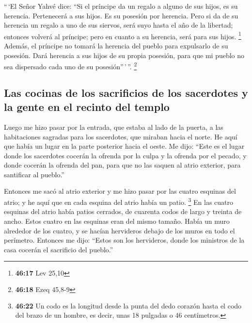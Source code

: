 \begin{paracol}{2}
 ``\,`El Señor Yahvé dice: ``Si el príncipe da un regalo
a alguno de sus hijos, es su herencia. Pertenecerá a sus hijos. Es su
posesión por herencia.  Pero si da de su herencia un
regalo a uno de sus siervos, será suyo hasta el año de la libertad;
entonces volverá al príncipe; pero en cuanto a su herencia, será para
sus hijos. \footnote{\textbf{46:17} Lev 25,10}  Además,
el príncipe no tomará la herencia del pueblo para expulsarlo de su
posesión. Dará herencia a sus hijos de su propia posesión, para que mi
pueblo no sea dispersado cada uno de su posesión''\,'\,''. \footnote{\textbf{46:18}
  Ezeq 45,8-9}

\hypertarget{las-cocinas-de-los-sacrificios-de-los-sacerdotes-y-la-gente-en-el-recinto-del-templo}{%
\subsection{Las cocinas de los sacrificios de los sacerdotes y la gente
en el recinto del
templo}\label{las-cocinas-de-los-sacrificios-de-los-sacerdotes-y-la-gente-en-el-recinto-del-templo}}

 Luego me hizo pasar por la entrada, que estaba al lado
de la puerta, a las habitaciones sagradas para los sacerdotes, que
miraban hacia el norte. He aquí que había un lugar en la parte posterior
hacia el oeste.  Me dijo: ``Este es el lugar donde los
sacerdotes cocerán la ofrenda por la culpa y la ofrenda por el pecado, y
donde cocerán la ofrenda del pan, para que no las saquen al atrio
exterior, para santificar al pueblo.''

 Entonces me sacó al atrio exterior y me hizo pasar por
las cuatro esquinas del atrio; y he aquí que en cada esquina del atrio
había un patio.  \footnote{\textbf{46:22} Un codo es la
  longitud desde la punta del dedo corazón hasta el codo del brazo de un
  hombre, es decir, unas 18 pulgadas o 46 centímetros.} En las cuatro
esquinas del atrio había patios cerrados, de cuarenta codos de largo y
treinta de ancho. Estos cuatro en las esquinas eran del mismo tamaño.
 Había un muro alrededor de los cuatro, y se hacían
hervideros debajo de los muros en todo el perímetro. 
Entonces me dijo: ``Estos son los hervideros, donde los ministros de la
casa cocerán el sacrificio del pueblo.''

\switchcolumn
\begin{otherlanguage}{english}


\end{otherlanguage}
\end{paracol}
